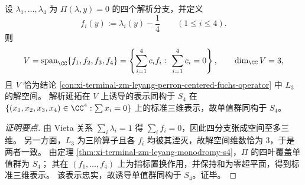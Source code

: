 \begin{conclusion}\label{con:xi-terminal-zm-leyang-perron-fuchs-monodromy-s4}
设 \(\lambda_1,\dots,\lambda_4\) 为 \(\Pi(\lambda,y)=0\) 的四个解析分支，并定义
\[
f_i(y):=\lambda_i(y)-\frac14\qquad(1\le i\le 4).
\]
则
\[
V=\mathrm{span}_{\CC}\{f_1,f_2,f_3,f_4\}
=
\left\{\sum_{i=1}^4 c_i f_i:\ \sum_{i=1}^4 c_i=0\right\},
\qquad \dim_{\CC}V=3,
\]
且 \(V\) 恰为结论 \ref{con:xi-terminal-zm-leyang-perron-centered-fuchs-operator} 中 \(L_3\) 的解空间。
解析延拓在 \(V\) 上诱导的表示同构于 \(S_4\) 在
\(
\{(x_1,x_2,x_3,x_4)\in\CC^4:\sum x_i=0\}
\)
上的标准三维表示，故单值群同构于 \(S_4\)。
\end{conclusion}
\begin{proof}[证明要点]
由 Vieta 关系 \(\sum_i\lambda_i=1\) 得 \(\sum_i f_i=0\)，因此四分支张成空间至多三维。
另一方面，\(L_3\) 为三阶算子且各 \(f_i\) 均被其湮灭，故解空间维数恰为 \(3\)，于是两者一致。
由定理 \ref{thm:xi-terminal-zm-leyang-monodromy-s4}，\(\Pi\) 的四叶覆盖单值群为 \(S_4\)；
其在 \((f_1,\dots,f_4)\) 上为指标置换作用，并保持和为零超平面，得到标准三维表示。
该表示忠实，故诱导单值群同构于 \(S_4\)。证毕。
\end{proof}

